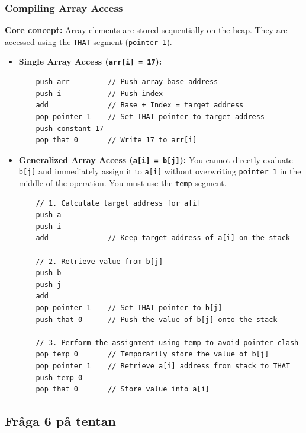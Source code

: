 \documentclass[12pt,a4paper]{article}
\begin{document}
\subsubsection*{Compiling Array Access}
\textbf{Core concept:} Array elements are stored sequentially on the heap. They are accessed using the \texttt{THAT} segment (\texttt{pointer 1}).
\begin{itemize}
    \item \textbf{Single Array Access (\texttt{arr[i] = 17}):}
    \begin{verbatim}
    push arr         // Push array base address
    push i           // Push index
    add              // Base + Index = target address
    pop pointer 1    // Set THAT pointer to target address
    push constant 17
    pop that 0       // Write 17 to arr[i]
    \end{verbatim}
    \item \textbf{Generalized Array Access (\texttt{a[i] = b[j]}):} You cannot directly evaluate \texttt{b[j]} and immediately assign it to \texttt{a[i]} without overwriting \texttt{pointer 1} in the middle of the operation. You must use the \texttt{temp} segment.
    \begin{verbatim}
    // 1. Calculate target address for a[i]
    push a
    push i
    add              // Keep target address of a[i] on the stack
    
    // 2. Retrieve value from b[j]
    push b
    push j
    add
    pop pointer 1    // Set THAT pointer to b[j]
    push that 0      // Push the value of b[j] onto the stack
    
    // 3. Perform the assignment using temp to avoid pointer clash
    pop temp 0       // Temporarily store the value of b[j]
    pop pointer 1    // Retrieve a[i] address from stack to THAT
    push temp 0
    pop that 0       // Store value into a[i]
    \end{verbatim}
\end{itemize}

\subsection{Fråga 6 på tentan}
\end{document}
